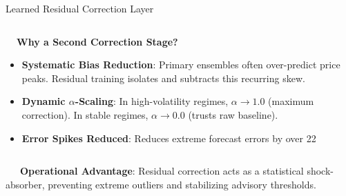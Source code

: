 \documentclass{beamer}
\begin{document}
\begin{frame}{Learned Residual Correction Layer}
\begin{columns}[T]
    \begin{column}{0.48\textwidth}
        \begin{smallcard}[0.98\textwidth, top=3pt, bottom=3pt, left=4pt, right=4pt, boxsep=0.5pt]
            \centering \textbf{\textcolor{primaryDark}{\small {}~~Why a Second Correction Stage?}}
            \vspace{0.08cm}
            \fontsize{6.8pt}{8.2pt}\selectfont
            \begin{itemize}\setlength\itemsep{4pt}\setlength\parskip{0pt}
                \item \textbf{Systematic Bias Reduction}: Primary ensembles often over-predict price peaks. Residual training isolates and subtracts this recurring skew.
                \item \textbf{Dynamic $\alpha$-Scaling}: In high-volatility regimes, $\alpha \rightarrow 1.0$ (maximum correction). In stable regimes, $\alpha \rightarrow 0.0$ (trusts raw baseline).
                \item \textbf{Error Spikes Reduced}: Reduces extreme forecast errors by over 22%
            \end{itemize}
        \end{smallcard}
    \end{column}
\end{columns}

\vspace{0.15cm}
\begin{tcolorbox}[enhanced, colback=primaryblue!4, colframe=primaryblue!30, boxrule=0.35pt,
  arc=3.5pt, width=0.98\textwidth, left=4pt, right=4pt, top=2.5pt, bottom=2.5pt, boxsep=0pt,
  halign=center, shadow={0.5pt}{-0.5pt}{0pt}{black!8}]
    \fontsize{5.5pt}{6.5pt}\selectfont
    \textcolor{primaryDark}{~~~\textbf{Operational Advantage}: Residual correction acts as a statistical shock-absorber, preventing extreme outliers and stabilizing advisory thresholds.}
\end{tcolorbox}
\end{frame}
\end{document}
